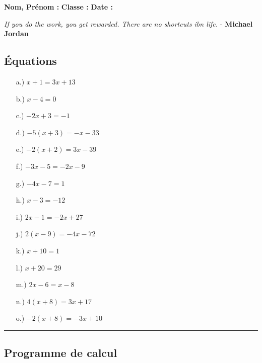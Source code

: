\documentclass[11pt]{article}
\newcommand{\horrule}[1]{\rule{\linewidth}{#1}} %
\begin{document}
\newpage

\textbf{Nom, Prénom :} \hspace{8cm} \textbf{Classe :} \hspace{3cm} \textbf{Date :}\\
\vspace{-0.8cm}
\begin{center}
  \textit{If you do the work, you get rewarded. There are no shortcuts ibn life.}  - \textbf{Michael Jordan}
\end{center}
\vspace{-0.8cm}

\subsection*{Équations}
\begin{multicols}{3}\noindent
  \begin{enumerate}
  \item[a.)] $x + 1 = 3x + 13$
  \item[b.)] $x - 4 = 0$
  \item[c.)] $-2x + 3 = -1$
  \item[d.)] $-5(x + 3) = -x - 33$
  \item[e.)] $-2(x + 2) = 3x - 39$
  \item[f.)] $-3x - 5 = -2x - 9$
  \item[g.)] $-4x - 7 = 1$
  \item[h.)] $x - 3 = -12$
  \item[i.)] $2x - 1 = -2x + 27$
  \item[j.)] $2(x - 9) = -4x - 72$
  \item[k.)] $x + 10 = 1$
  \item[l.)] $x + 20 = 29$
  \item[m.)] $2x - 6 = x - 8$
  \item[n.)] $4(x + 8) = 3x + 17$
  \item[o.)] $-2(x + 8) = -3x + 10$
  \end{enumerate}
\end{multicols}

\vspace{-0.4cm}
\horrule{1px}
\vspace{-0.8cm}

\subsection*{Programme de calcul}
\end{document}
